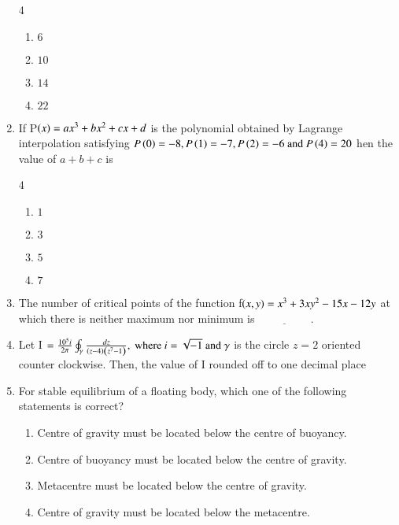\documentclass[journal]{IEEEtran}
\begin{document}
\begin{enumerate}
\begin{multicols} {4}
    \begin{enumerate}
        \item $6$
        \item $10$
        \item $14$
        \item $22$
    \end{enumerate}
\end{multicols}
\bigskip

\item If P$\left(x\right)=ax^{3}+bx^{2}+cx+d$ is the polynomial obtained by Lagrange interpolation satisfying $P\left(0\right)=-8,P\left(1\right)=-7,P\left(2\right)=-6\text{ and }P\left(4\right)=20$ hen the value of $a+b+c$ is 

\begin{multicols} {4}
    \begin{enumerate}
        \item $1$
        \item $3$
        \item $5$
        \item $7$
    \end{enumerate}
\end{multicols}
\bigskip

\item The number of critical points of the function f$\left(x,y\right)=x^{3}+3xy^{2}-15x-12y$ at which there is neither maximum nor minimum is $\underline{\hspace{2cm}}.$
\bigskip

\item Let I $=\frac{10^{5}i}{2\pi}\oint_{\gamma}\frac{dz}{\left(z-4\right)\left(z^{7}-1\right)},\text{ where } i = \sqrt{-1} \text{ and } \gamma$ is the circle $z=2$ oriented counter clockwise. Then, the value of I rounded off to one decimal place
\bigskip

\item For stable equilibrium of a floating body, which one of the following statements is correct?

\begin{enumerate}
    \item Centre of gravity must be located below the centre of buoyancy.
     \item Centre of buoyancy must be located below the centre of gravity.
    \item Metacentre must be located below the centre of gravity.
     \item Centre of gravity must be located below the metacentre.
\end{enumerate}
\bigskip


\end{enumerate}
\end{document}
